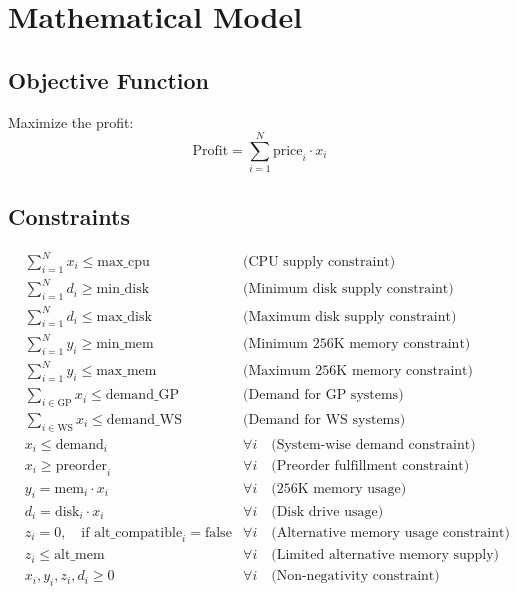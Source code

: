 \documentclass{article}
\begin{document}
\section*{Mathematical Model}

\subsection*{Objective Function}
Maximize the profit:
\[
\text{Profit} = \sum_{i=1}^{N} \text{price}_i \cdot x_i
\]

\subsection*{Constraints}

\begin{align}
& \sum_{i=1}^{N} x_i \leq \text{max\_cpu} & \text{(CPU supply constraint)} \label{cpu_constraint} \\
& \sum_{i=1}^{N} d_i \geq \text{min\_disk} & \text{(Minimum disk supply constraint)} \label{min_disk_constraint} \\
& \sum_{i=1}^{N} d_i \leq \text{max\_disk} & \text{(Maximum disk supply constraint)} \label{max_disk_constraint} \\
& \sum_{i=1}^{N} y_i \geq \text{min\_mem} & \text{(Minimum 256K memory constraint)} \label{min_mem_constraint} \\
& \sum_{i=1}^{N} y_i \leq \text{max\_mem} & \text{(Maximum 256K memory constraint)} \label{max_mem_constraint} \\
& \sum_{i \in \text{GP}} x_i \leq \text{demand\_GP} & \text{(Demand for GP systems)} \label{gp_demand} \\
& \sum_{i \in \text{WS}} x_i \leq \text{demand\_WS} & \text{(Demand for WS systems)} \label{ws_demand} \\
& x_i \leq \text{demand}_i & \forall i \quad \text{(System-wise demand constraint)} \label{system_demand_constraint} \\
& x_i \geq \text{preorder}_i & \forall i \quad \text{(Preorder fulfillment constraint)} \label{preorder_constraint} \\
& y_i = \text{mem}_i \cdot x_i & \forall i \quad \text{(256K memory usage)} \label{memory_usage_constraint} \\
& d_i = \text{disk}_i \cdot x_i & \forall i \quad \text{(Disk drive usage)} \label{disk_usage_constraint} \\
& z_i = 0, \quad \text{if } \text{alt\_compatible}_i = \text{false} & \forall i \quad \text{(Alternative memory usage constraint)} \label{alt_mem_constraint} \\
& z_i \leq \text{alt\_mem} & \forall i \quad \text{(Limited alternative memory supply)} \label{alt_mem_supply} \\
& x_i, y_i, z_i, d_i \geq 0 & \forall i \quad \text{(Non-negativity constraint)} \label{nonnegativity_constraint}
\end{align}
\end{document}
